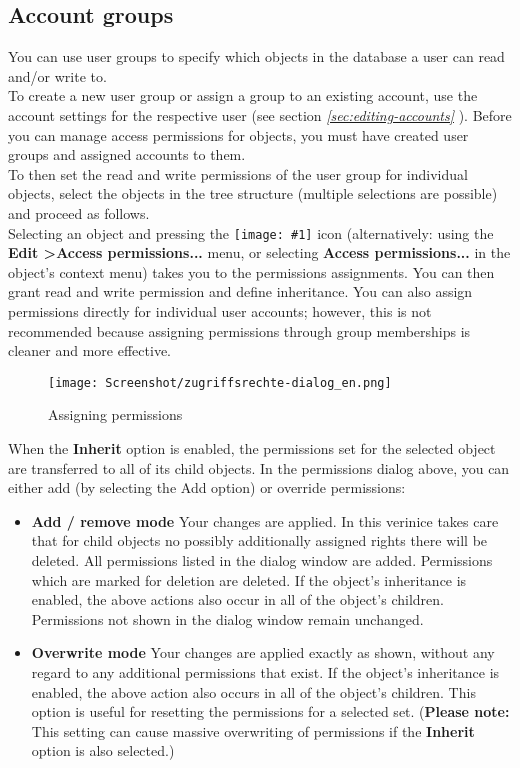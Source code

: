 \documentclass[a4paper,10pt]{book}
\newcommand{\icon}[1]{\texttt{[image: \#1]}}
\begin{document}
\subsection{Account groups} \label{Account groups}
You can use user groups to specify which objects in the database a user can read and/or write to.
\newline\\
To create a new user group or assign a group to an existing account, use the account settings for the respective user (see
section {\em \ref{sec:editing-accounts} }).
Before you can manage access permissions for objects, you must have created user groups and assigned accounts to them.
\newline\\
To then set the read and write permissions of the user group for individual objects, select the objects in the tree structure
(multiple selections are possible) and proceed as follows.
\newline\\
Selecting an object and pressing the \icon{Icon/Zugriffsrechte.png} icon (alternatively: using the
\textbf{Edit \textgreater Access permissions...} menu, or selecting \textbf{Access permissions...} in the object's
context menu) takes you to the permissions assignments. You can then grant read and write permission and define
inheritance. You can also assign permissions directly for individual user accounts; however, this is not recommended
because assigning permissions through group memberships is cleaner and more effective.
\newline
\begin{figure}[htb!]
  \centering
  \texttt{[image: Screenshot/zugriffsrechte-dialog\_en.png]}
  \caption{\label{Assigning permissions} Assigning permissions}
\end{figure}
\newline
When the \textbf{Inherit} option is enabled, the permissions set for the selected object are transferred to all of its child objects.
In the permissions dialog above, you can either add (by selecting the Add option) or override permissions:
\begin{itemize}
 \item \textbf{Add / remove mode}
     \subitem Your changes are applied. In this verinice takes care that for child objects no possibly additionally assigned rights there will be deleted. All permissions listed in the dialog window are added. Permissions which are marked for deletion are deleted. If the object’s inheritance is enabled, the above actions also occur in all of the object’s children. Permissions not shown in the dialog window remain unchanged.
 \item \textbf{Overwrite mode}
    \subitem Your changes are applied exactly as shown, without any regard to any additional permissions that exist. If the object’s inheritance is enabled, the above action also occurs in all of the object’s children. This option is useful for resetting the permissions for a selected set. (\textbf{Please note:}
    This setting can cause massive overwriting of permissions if the \textbf{Inherit} option is also selected.)
\end{itemize}
\end{document}
